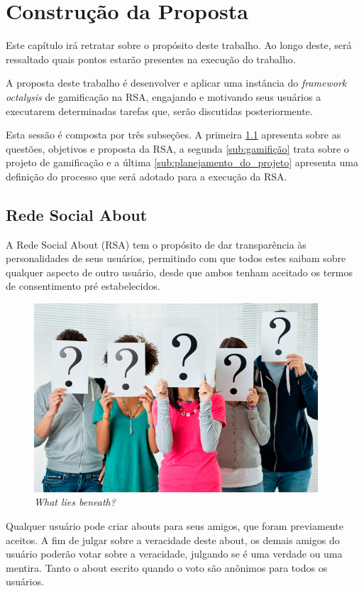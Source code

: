 \chapter[Construção da Proposta]{Construção da Proposta}

Este capítulo irá retratar sobre o propósito deste trabalho. Ao longo deste, será ressaltado quais
pontos estarão presentes na execução do trabalho.

A proposta deste trabalho é desenvolver e aplicar uma instância do \textit{framework} \textit{octalysis} de gamificação na RSA, engajando e
motivando seus usuários a executarem determinadas tarefas que, serão discutidas posteriormente.

Esta sessão é composta por três subseções. A primeira \ref{sub:redesocialabout} apresenta sobre
as questões, objetivos e proposta da RSA, a segunda \ref{sub:gamifição} trata
sobre o projeto de gamificação e a última \ref{sub:planejamento_do_projeto} apresenta uma definição
do processo que será adotado para a execução da RSA.

\section{Rede Social About}
\label{sub:redesocialabout}
A Rede Social About (RSA) tem o propósito de dar transparência às personalidades de seus usuários, permitindo com que todos
estes saibam sobre qualquer aspecto de outro usuário, desde que ambos tenham aceitado os
termos de consentimento pré estabelecidos.

\begin{figure}[h]
    \centering
    \includegraphics[width=400px, scale=1]{figuras/pessoas-duvida}
    \caption{\textit{What lies beneath?}}
    \label{fig:pessoas-duvida}
\end{figure}

Qualquer usuário pode criar abouts para seus amigos, que foram previamente aceitos. A fim de julgar
sobre a veracidade deste about, os demais amigos do usuário poderão votar sobre a veracidade,
julgando se é uma verdade ou uma mentira. Tanto o about escrito quando o voto são anônimos para todos os
usuários.

